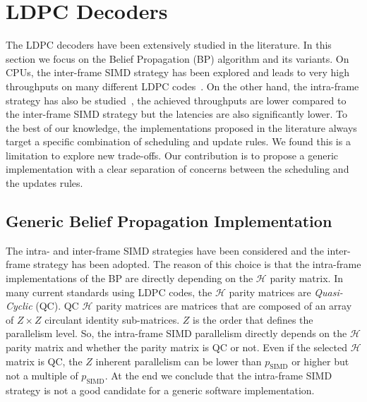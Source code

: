 \section{LDPC Decoders}
\label{sec:opt_ldpc}

The LDPC decoders have been extensively studied in the literature. In this
section we focus on the Belief Propagation (BP) algorithm and its variants. On
CPUs, the inter-frame SIMD strategy has been explored and leads to very high
throughputs on many different LDPC codes~\cite{LeGal2016}. On the other hand,
the intra-frame strategy has also be studied~\cite{LeGal2019a,Xu2019}, the
achieved throughputs are lower compared to the inter-frame SIMD strategy but the
latencies are also significantly lower. To the best of our knowledge, the
implementations proposed in the literature always target a specific combination
of scheduling and update rules. We found this is a limitation to explore new
trade-offs. Our contribution is to propose a generic implementation with a clear
separation of concerns between the scheduling and the updates rules.

\subsection{Generic Belief Propagation Implementation}
\label{sec:opt_ldpc_gen}

The intra- and inter-frame SIMD strategies have been considered and the
inter-frame strategy has been adopted. The reason of this choice is that
the intra-frame implementations of the BP are directly depending on the
$\mathcal{H}$ parity matrix. In many current standards using LDPC codes, the
$\mathcal{H}$ parity matrices are \emph{Quasi-Cyclic} (QC). QC $\mathcal{H}$
parity matrices are matrices that are composed of an array of $Z \times Z$
circulant identity sub-matrices. $Z$ is the order that defines the parallelism
level. So, the intra-frame SIMD parallelism directly depends on the
$\mathcal{H}$ parity matrix and whether the parity matrix is QC or not. Even if
the selected $\mathcal{H}$ matrix is QC, the $Z$ inherent parallelism can be
lower than $p_\text{SIMD}$ or higher but not a multiple of $p_\text{SIMD}$. At
the end we conclude that the intra-frame SIMD strategy is not a good candidate
for a generic software implementation.

